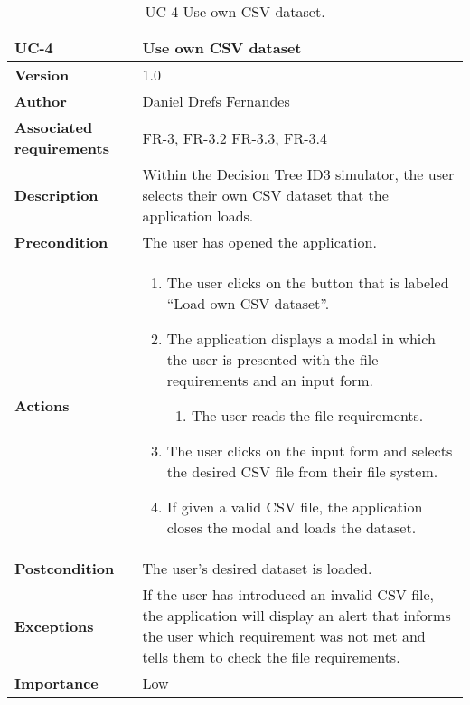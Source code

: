 \begin{table}[p]
	\centering
	\begin{tabularx}{\linewidth}{ p{} p{} }
		\toprule
		\textbf{UC-4}    & \textbf{Use own CSV dataset}\\
		\toprule
		\textbf{Version}              & 1.0    \\
		\textbf{Author}                & Daniel Drefs Fernandes \\
		\textbf{Associated requirements} & FR-3, FR-3.2 FR-3.3, FR-3.4 \\
		\textbf{Description}          & Within the Decision Tree ID3 simulator, the user selects their own CSV dataset that the application loads. \\
		\textbf{Precondition}         & The user has opened the application. \\
		\textbf{Actions}             &
		\begin{enumerate}
			\def\labelenumi{\arabic{enumi}.}
			\tightlist
			\item The user clicks on the button that is labeled ``Load own CSV dataset''.
			\item The application displays a modal in which the user is presented with the file requirements and an input form.
            \begin{enumerate}
                \item The user reads the file requirements.
            \end{enumerate}
            \item The user clicks on the input form and selects the desired CSV file from their file system.
            \item If given a valid CSV file, the application closes the modal and loads the dataset.
		\end{enumerate}\\
		\textbf{Postcondition}        & The user's desired dataset is loaded. \\
		\textbf{Exceptions}          & If the user has introduced an invalid CSV file, the application will display an alert that informs the user which requirement was not met and tells them to check the file requirements. \\
		\textbf{Importance}          & Low \\
		\bottomrule
	\end{tabularx}
	\caption{UC-4 Use own CSV dataset.}
    \label{table:uc_4}
\end{table}
